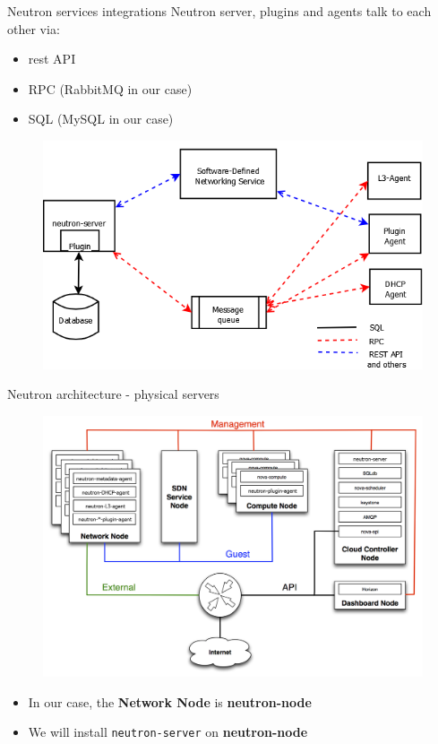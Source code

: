 \documentclass[english,serif,mathserif,xcolor=pdftex,dvipsnames,table]{beamer}
\begin{document}
\begin{frame}{Neutron services integrations}
  Neutron server, plugins and agents talk to each other via:
  \begin{itemize}
  \item rest API
  \item RPC (RabbitMQ in our case)
  \item SQL (MySQL in our case)
  \end{itemize}
  \begin{figure}
    \centering
    \includegraphics[width=0.8\linewidth]{sdn-connections}
  \end{figure}
\end{frame}

\begin{frame}
  {Neutron architecture - physical servers}

  \begin{figure}
    \centering    
    \includegraphics[width=0.9\linewidth]{1aa-network-domains-diagram}
  \end{figure}

  \begin{itemize}
  \item In our case, the \textbf{Network Node} is \textbf{neutron-node}
  \item We will install \texttt{neutron-server} on \textbf{neutron-node}
  \end{itemize}
\end{frame}
\end{document}
